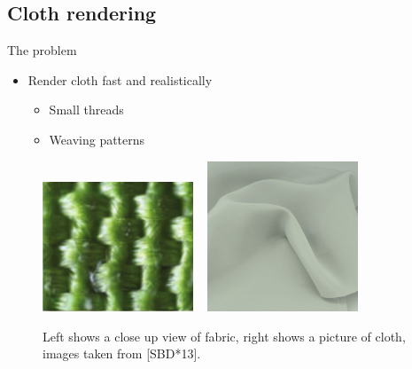 \documentclass{beamer}
\begin{document}

\subsection{Cloth rendering}
\begin{frame}{The problem}
\begin{itemize}
\setlength\itemsep{0.5em}
\item Render cloth fast and realistically 
		\begin{itemize}
		\setlength\itemsep{0.5em}
		\item Small threads
		\item Weaving patterns
		\end{itemize}
\end{itemize}
\begin{figure}[t!]
\begin{center}
\includegraphics[width=0.4\textwidth]{img/cloth_real} 
~
\includegraphics[width=0.4\textwidth]{img/cloth_reference}
\caption*{\tiny{Left shows a close up view of fabric, right shows a picture of cloth, images taken from [SBD*13].}}
\end{center}
\end{figure}
\end{frame}
\end{document}
